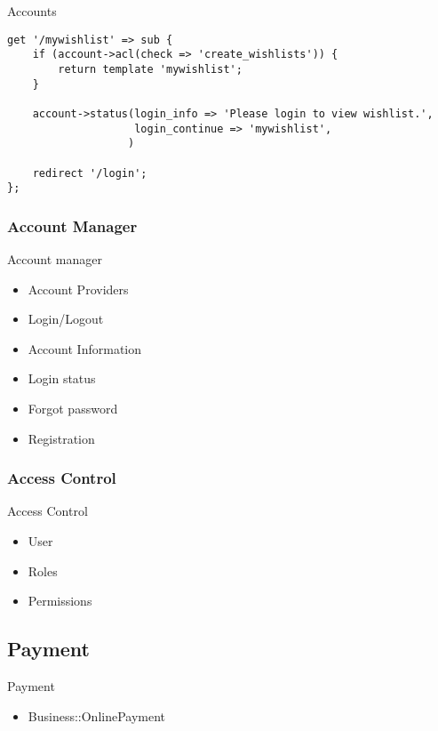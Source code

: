 \begin{frame}[fragile]{Accounts}
\begin{lstlisting}
get '/mywishlist' => sub {
    if (account->acl(check => 'create_wishlists')) {
        return template 'mywishlist';
    }

    account->status(login_info => 'Please login to view wishlist.',
                    login_continue => 'mywishlist',
                   )

    redirect '/login';
};
\end{lstlisting}
\end{frame}

\subsubsection{Account Manager}
\begin{frame}{Account manager}
\begin{itemize}
\item Account Providers
\item Login/Logout
\item Account Information
\item Login status
\item Forgot password
\item Registration
\end{itemize}
\end{frame}

\subsubsection{Access Control}
\begin{frame}{Access Control}
\begin{itemize}
\item User
\item Roles
\item Permissions
\end{itemize}
\end{frame}

\subsection{Payment}

\begin{frame}{Payment}
\begin{itemize}
\item Business::OnlinePayment
\end{itemize}
\end{frame}

